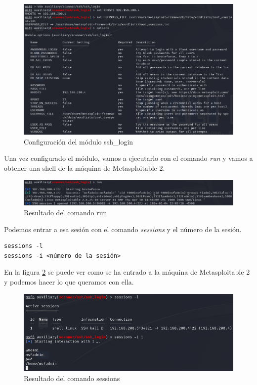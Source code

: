 \documentclass[11pt]{report}
\begin{document}
\begin{figure}[H]
  \centering
  \includegraphics[scale=0.6]{img/ssh_msf.png}
  \caption{Configuración del módulo ssh\_login}
  \label{fig:Configuración del módulo ssh_login}
\end{figure}

Una vez configurado el módulo, vamos a ejecutarlo con el comando \emph{run} y vamos a obtener una shell de la máquina de Metasploitable 2.
\begin{figure}[H]
  \centering
  \includegraphics[scale=0.6]{img/ssh_msf_result.png}
  \caption{Resultado del comando run}
\end{figure}

Podemos entrar a esa sesión con el comando \emph{sessions} y el número de la sesión.
\begin{verbatim}
sessions -l
sessions -i <número de la sesión>
\end{verbatim}

En la figura \ref{fig:Resultado del comando sessions} se puede ver como se ha entrado a la máquina de Metasploitable 2 y podemos hacer lo que queramos con ella.

\begin{figure}[H]
  \centering
  \includegraphics[scale=0.6]{img/ssh_msf_session.png}
  \caption{Resultado del comando sessions}
  \label{fig:Resultado del comando sessions}
\end{figure}
\end{document}
